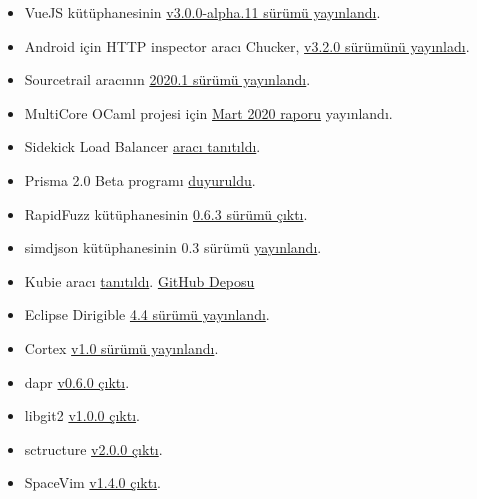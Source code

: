 \documentclass[11pt]{article}
\begin{document}
\begin{itemize}
\item VueJS kütüphanesinin \href{https://github.com/vuejs/vue-next/releases/tag/v3.0.0-alpha.11}{v3.0.0-alpha.11 sürümü yayınlandı}.
\item Android için HTTP inspector aracı Chucker, \href{https://github.com/ChuckerTeam/chucker/releases/tag/3.2.0}{v3.2.0 sürümünü yayınladı}.
\item Sourcetrail aracının \href{https://www.sourcetrail.com/blog/release\_2020\_1/}{2020.1 sürümü yayınlandı}.
\item MultiCore OCaml projesi için \href{https://discuss.ocaml.org/t/multicore-ocaml-march-2020-update/5406}{Mart 2020 raporu} yayınlandı.
\item Sidekick Load Balancer \href{https://blog.min.io/introducing-sidekick-a-high-performance-load-balancer/}{aracı tanıtıldı}.
\item Prisma 2.0 Beta programı \href{https://www.prisma.io/blog/prisma-2-beta-b7bcl0gd8d8e}{duyuruldu}.
\item RapidFuzz kütüphanesinin \href{https://github.com/rhasspy/rapidfuzz/releases/tag/0.6.3}{0.6.3 sürümü çıktı}.
\item simdjson kütüphanesinin 0.3 sürümü \href{https://lemire.me/blog/2020/03/31/we-released-simdjson-0-3-the-fastest-json-parser-in-the-world-is-even-better/}{yayınlandı}.
\item Kubie aracı \href{https://blog.sbstp.ca/introducing-kubie/}{tanıtıldı}. \href{https://github.com/sbstp/kubie}{GitHub Deposu}
\item Eclipse Dirigible \href{https://www.dirigible.io/release/2020/04/04/news\_new\_release\_4\_4.html}{4.4 sürümü yayınlandı}.
\item Cortex \href{https://grafana.com/blog/2020/04/02/cortex-v1.0-released-the-highly-scalable-fast-prometheus-implementation-is-generally-available-for-production-use/}{v1.0 sürümü yayınlandı}.
\item dapr \href{https://github.com/dapr/dapr/releases/tag/v0.6.0}{v0.6.0 çıktı}.
\item libgit2 \href{https://github.com/libgit2/libgit2/releases/tag/v1.0.0}{v1.0.0 çıktı}.
\item sctructure \href{https://github.com/talyssonoc/structure/releases/tag/v2.0.0}{v2.0.0 çıktı}.
\item SpaceVim \href{https://spacevim.org/SpaceVim-release-v1.4.0/}{v1.4.0 çıktı}.
\end{itemize}
\end{document}
